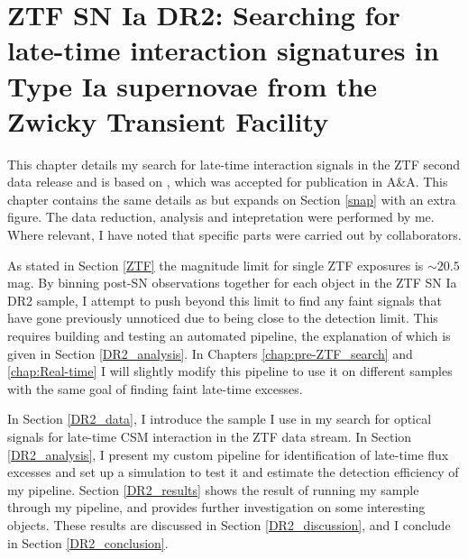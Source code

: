 \documentclass[a4paper,oneside,12pt, class=Latex/Classes/PhDthesisPSnPDF, crop=false]{standalone}
\begin{document}
\doublespacing
\chapter{ZTF SN Ia DR2: Searching for late-time interaction signatures in Type Ia supernovae from the Zwicky Transient Facility}
\label{chap:DR2_search}
This chapter details my search for late-time interaction signals in the ZTF second data release \citep[ZTF SN Ia DR2,][Smith et al., in prep.]{DR2_Overview} and is based on \citet{Terwel_2024_paper1}, which was accepted for publication in A\&A. This chapter contains the same details as \citet{Terwel_2024_paper1} but expands on Section \ref{snap} with an extra figure. The data reduction, analysis and intepretation were performed by me. Where relevant, I have noted that specific parts were carried out by collaborators.

As stated in Section \ref{ZTF} the magnitude limit for single ZTF exposures is $\sim20.5$ mag. By binning post-SN observations together for each object in the ZTF SN Ia DR2 sample, I attempt to push beyond this limit to find any faint signals that have gone previously unnoticed due to being close to the detection limit. This requires building and testing an automated pipeline, the explanation of which is given in Section \ref{DR2_analysis}. In Chapters \ref{chap:pre-ZTF_search} and \ref{chap:Real-time} I will slightly modify this pipeline to use it on different samples with the same goal of finding faint late-time excesses.

In Section \ref{DR2_data}, I introduce the sample I use in my search for optical signals for late-time CSM interaction in the ZTF data stream. In Section \ref{DR2_analysis}, I present my custom pipeline for identification of late-time flux excesses and set up a simulation to test it and estimate the detection efficiency of my pipeline. Section \ref{DR2_results} shows the result of running my sample through my pipeline, and provides further investigation on some interesting objects. These results are discussed in Section \ref{DR2_discussion}, and I conclude in Section \ref{DR2_conclusion}.

\end{document}
